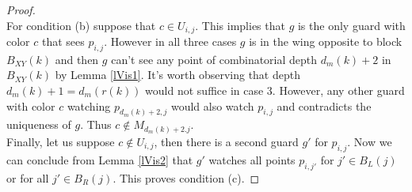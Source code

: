 \documentclass[a4paper,USenglish,numberwithinsect]{lipics}
\theoremstyle{plain}
\begin{document}
\begin{proof}
\\
For condition (b) suppose that  $c \in U_{i,j}$. This implies that $g$
is the only guard with
color $c$ that sees $p_{i,j}$. However in all three
cases $g$ is in the wing opposite  to  block $B_{XY}(k)$ and then $g$
can't see any point of
combinatorial depth ${d_m(k)+2}$ in $B_{XY}(k)$ by Lemma \ref{lVis1}.
It's worth observing that
depth ${d_m(k)+1}=d_m(r(k))$  would not suffice in case 3.
However, any other guard with color $c$ watching $p_{d_m(k)+2,j}$ would also watch 
$p_{i,j}$ and
contradicts the uniqueness of $g$. Thus $ c \not \in M_{d_m(k)+2.j}$.
\\
Finally, let us suppose $c \not \in U_{i,j}$, then there is a second
guard $g'$
for  $p_{i,j}$. Now  we can conclude from  Lemma \ref{lVis2} that $g'$
watches
all  points $p_{i,j'}$ for   $j' \in B_L(j)$ or for all $j' \in B_R(j)$.
This proves condition (c).
\end{proof}
\end{document}
